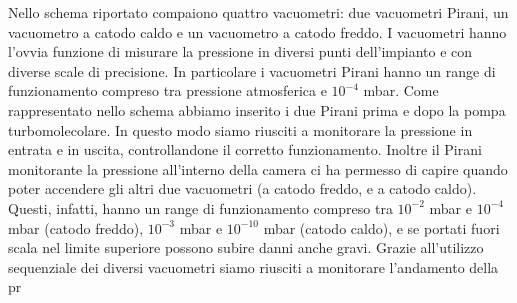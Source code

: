 \documentclass[11pt]{article}
\begin{document}

\par Nello schema riportato compaiono quattro vacuometri: due vacuometri Pirani, un vacuometro a catodo caldo e un vacuometro a catodo freddo. I vacuometri hanno l'ovvia funzione di misurare la pressione in diversi punti dell'impianto e con diverse scale di precisione. In particolare i vacuometri Pirani hanno un range di funzionamento compreso tra pressione atmosferica e $10^{-4}$ mbar. Come rappresentato nello schema abbiamo inserito i due Pirani prima e dopo la pompa turbomolecolare. In questo modo siamo riusciti a monitorare la pressione in entrata e in uscita, controllandone il corretto funzionamento. Inoltre il Pirani monitorante la pressione all'interno della camera ci ha permesso di capire quando poter accendere gli altri due vacuometri (a catodo freddo, e a catodo caldo). Questi, infatti, hanno un range di funzionamento compreso tra $10^{-2}$ \unit{mbar} e $10^{-4}$ \unit{mbar} (catodo freddo), $10^{-3}$ \unit{mbar} e $10^{-10}$ \unit{mbar} (catodo caldo), e se portati fuori scala nel limite superiore possono subire danni anche gravi. Grazie all'utilizzo sequenziale dei diversi vacuometri siamo riusciti a monitorare l'andamento della pr
\end{document}
